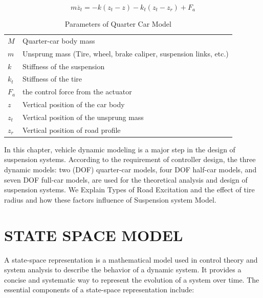 \begin{equation}
	m\ddot{z_t}=-k(z_t-z)-k_t(z_t-z_r)+ F_a
	\label{eqn:4.1}
\end{equation}
\begin{table}[H]
	\centering
	\caption{Parameters of Quarter Car Model \cite{turkay2005study}}
	\begin{tabular}{ l|l }
		\hline
		$M$   & Quarter-car body mass                                              \\
		$m$   & Unsprung mass (Tire, wheel, brake caliper, suspension links, etc.) \\
		$k$   & Stiffness of the suspension                                        \\
		$k_t$ & Stiffness of the tire                                              \\
		$F_a$ &  the control force from the actuator                  \\
		$z$   & Vertical position of the car body                                  \\
		$z_t$ & Vertical position of the unsprung mass                             \\
		$z_r$ & Vertical position of road profile                                  \\
		\hline
	\end{tabular}
	\label{table:qcm}
\end{table}


In this chapter, vehicle dynamic modeling is a major step in the design of suspension systems. According to the requirement of controller design, the three dynamic models: two (DOF) quarter-car models, four DOF half-car models, and seven DOF full-car models, are used for the theoretical analysis and design of suspension systems. \cite{sun2020advanced}
We Explain Types of Road Excitation and the effect of tire radius and how these factors influence of Suspension system Model.


\section{STATE SPACE MODEL}
A state-space representation is a mathematical model used in control theory and system analysis to describe the behavior of a dynamic system. It provides a concise and systematic way to represent the evolution of a system over time. The essential components of a state-space representation include:

